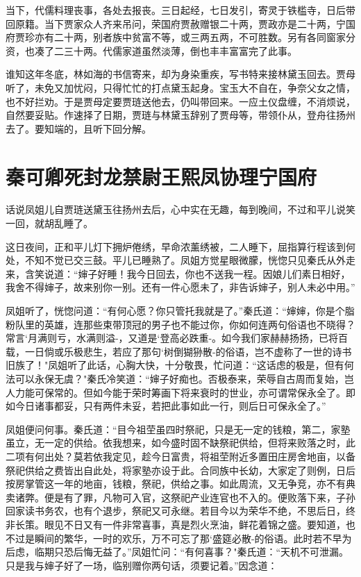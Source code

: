 当下，代儒料理丧事，各处去报丧。三日起经，七日发引，寄灵于铁槛寺，日后带回原籍。当下贾家众人齐来吊问，荣国府贾赦赠银二十两，贾政亦是二十两，宁国府贾珍亦有二十两，别者族中贫富不等，或三两五两，不可胜数。另有各同窗家分资，也凑了二三十两。代儒家道虽然淡薄，倒也丰丰富富完了此事。

谁知这年冬底，林如海的书信寄来，却为身染重疾，写书特来接林黛玉回去。贾母听了，未免又加忧闷，只得忙忙的打点黛玉起身。宝玉大不自在，争奈父女之情，也不好拦劝。于是贾母定要贾琏送他去，仍叫带回来。一应土仪盘缠，不消烦说，自然要妥贴。作速择了日期，贾琏与林黛玉辞别了贾母等，带领仆从，登舟往扬州去了。要知端的，且听下回分解。

\chapter{秦可卿死封龙禁尉\ttlbreak 王熙凤协理宁国府}

话说凤姐儿自贾琏送黛玉往扬州去后，心中实在无趣，每到晚间，不过和平儿说笑一回，就胡乱睡了。

这日夜间，正和平儿灯下拥炉倦绣，早命浓薰绣被，二人睡下，屈指算行程该到何处，不知不觉已交三鼓。平儿已睡熟了。凤姐方觉星眼微朦，恍惚只见秦氏从外走来，含笑说道：“婶子好睡！我今日回去，你也不送我一程。因娘儿们素日相好，我舍不得婶子，故来别你一别。还有一件心愿未了，非告诉婶子，别人未必中用。”

凤姐听了，恍惚问道：“有何心愿？你只管托我就是了。”秦氏道：“婶婶，你是个脂粉队里的英雄，连那些束带顶冠的男子也不能过你，你如何连两句俗语也不晓得？常言`月满则亏，水满则溢-，又道是`登高必跌重-。如今我们家赫赫扬扬，已将百载，一日倘或乐极悲生，若应了那句`树倒猢狲散-的俗语，岂不虚称了一世的诗书旧族了！"凤姐听了此话，心胸大快，十分敬畏，忙问道：“这话虑的极是，但有何法可以永保无虞？"秦氏冷笑道：“婶子好痴也。否极泰来，荣辱自古周而复始，岂人力能可保常的。但如今能于荣时筹画下将来衰时的世业，亦可谓常保永全了。即如今日诸事都妥，只有两件未妥，若把此事如此一行，则后日可保永全了。”

凤姐便问何事。秦氏道：“目今祖茔虽四时祭祀，只是无一定的钱粮，第二，家塾虽立，无一定的供给。依我想来，如今盛时固不缺祭祀供给，但将来败落之时，此二项有何出处？莫若依我定见，趁今日富贵，将祖茔附近多置田庄房舍地亩，以备祭祀供给之费皆出自此处，将家塾亦设于此。合同族中长幼，大家定了则例，日后按房掌管这一年的地亩，钱粮，祭祀，供给之事。如此周流，又无争竞，亦不有典卖诸弊。便是有了罪，凡物可入官，这祭祀产业连官也不入的。便败落下来，子孙回家读书务农，也有个退步，祭祀又可永继。若目今以为荣华不绝，不思后日，终非长策。眼见不日又有一件非常喜事，真是烈火烹油，鲜花着锦之盛。要知道，也不过是瞬间的繁华，一时的欢乐，万不可忘了那`盛筵必散-的俗语。此时若不早为后虑，临期只恐后悔无益了。”凤姐忙问：“有何喜事？"秦氏道：“天机不可泄漏。只是我与婶子好了一场，临别赠你两句话，须要记着。”因念道：

